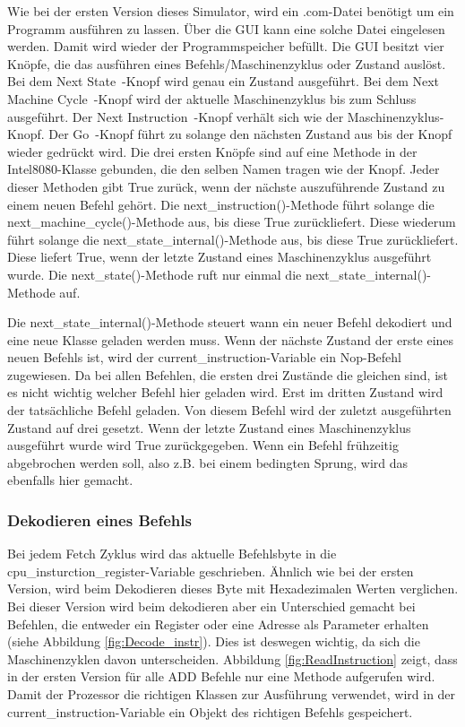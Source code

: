 \documentclass[12pt]{article}
\begin{document}
Wie bei der ersten Version dieses Simulator, wird ein .com-Datei benötigt um ein Programm ausführen zu lassen. Über die GUI kann eine solche Datei eingelesen werden. Damit wird wieder der Programmspeicher befüllt.
Die GUI besitzt vier Knöpfe, die das ausführen eines Befehls/Maschinenzyklus oder Zustand auslöst. Bei dem \glqq Next State\grqq\ -Knopf wird genau ein Zustand ausgeführt. Bei dem \glqq Next Machine Cycle\grqq\ -Knopf wird der aktuelle Maschinenzyklus bis zum Schluss ausgeführt. Der  \glqq Next Instruction\grqq\ -Knopf verhält sich wie der Maschinenzyklus-Knopf. Der \glqq Go\grqq\ -Knopf führt zu solange den nächsten Zustand aus bis der Knopf wieder gedrückt wird. Die drei ersten Knöpfe sind auf eine Methode in der Intel8080-Klasse gebunden, die den selben Namen tragen wie der Knopf. Jeder dieser Methoden gibt True zurück, wenn der nächste auszuführende Zustand zu einem neuen Befehl gehört.
Die next\_instruction()-Methode führt solange die next\_machine\_cycle()-Methode aus, bis diese True zurückliefert. Diese wiederum führt solange die next\_state\_internal()-Methode aus, bis diese True zurückliefert. Diese liefert True, wenn der letzte Zustand eines Maschinenzyklus ausgeführt wurde. Die next\_state()-Methode ruft nur einmal die next\_state\_internal()-Methode auf.

\noindent
Die next\_state\_internal()-Methode steuert wann ein neuer Befehl dekodiert und eine neue Klasse geladen werden muss. Wenn der nächste Zustand der erste eines neuen Befehls ist, wird der current\_instruction-Variable ein Nop-Befehl zugewiesen. Da bei allen Befehlen, die ersten drei Zustände die gleichen sind, ist es nicht wichtig welcher Befehl hier geladen wird. Erst im dritten Zustand wird der tatsächliche Befehl geladen. Von diesem Befehl wird der zuletzt ausgeführten Zustand auf drei gesetzt. Wenn der letzte Zustand eines Maschinenzyklus ausgeführt wurde wird True zurückgegeben. Wenn ein Befehl frühzeitig abgebrochen werden soll, also z.B. bei einem bedingten Sprung, wird das ebenfalls hier gemacht.

\subsubsection{Dekodieren eines Befehls}
Bei jedem Fetch Zyklus wird das aktuelle Befehlsbyte in die cpu\_insturction\_register-Variable geschrieben. Ähnlich wie bei der ersten Version, wird beim Dekodieren dieses Byte mit Hexadezimalen Werten verglichen. Bei dieser Version wird beim dekodieren aber ein Unterschied gemacht bei Befehlen, die entweder ein Register oder eine Adresse als Parameter erhalten (siehe Abbildung \ref{fig:Decode_instr}). Dies ist deswegen wichtig, da sich die Maschinenzyklen davon unterscheiden. Abbildung \ref{fig:ReadInstruction}  zeigt, dass in der ersten Version für alle ADD Befehle nur eine Methode aufgerufen wird. Damit der Prozessor die richtigen Klassen zur Ausführung verwendet, wird in der current\_instruction-Variable ein Objekt des richtigen Befehls gespeichert.
\end{document}
